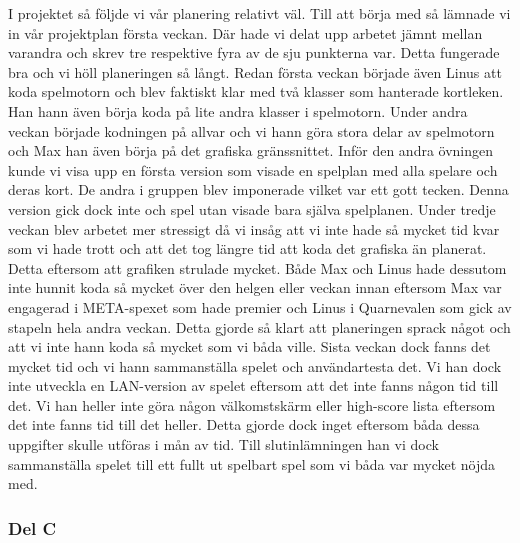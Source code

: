 \documentclass[10pt,a4paper]{article}
\begin{document}
I projektet så följde vi vår planering relativt väl. Till att börja med så lämnade vi in vår projektplan första veckan. Där hade vi delat upp arbetet jämnt mellan varandra och skrev tre respektive fyra av de sju punkterna var. Detta fungerade bra och vi höll planeringen så långt. Redan första veckan började även Linus att koda spelmotorn och blev faktiskt klar med två klasser som hanterade kortleken. Han hann även börja koda på lite andra klasser i spelmotorn. Under andra veckan började kodningen på allvar och vi hann göra stora delar av spelmotorn och Max han även börja på det grafiska gränssnittet. Inför den andra övningen kunde vi visa upp en första version som visade en spelplan med alla spelare och deras kort. De andra i gruppen blev imponerade vilket var ett gott tecken. Denna version gick dock inte och spel utan visade bara själva spelplanen. Under tredje veckan blev arbetet mer stressigt då vi insåg att vi inte hade så mycket tid kvar som vi hade trott och att det tog längre tid att koda det grafiska än planerat. Detta eftersom att grafiken strulade mycket. Både Max och Linus hade dessutom inte hunnit koda så mycket över den helgen eller veckan innan eftersom Max var engagerad i META-spexet som hade premier och Linus i Quarnevalen som gick av stapeln hela andra veckan. Detta gjorde så klart att planeringen sprack något och att vi inte hann koda så mycket som vi båda ville. Sista veckan dock fanns det mycket tid och vi hann sammanställa spelet och användartesta det. Vi han dock inte utveckla en LAN-version av spelet eftersom att det inte fanns någon tid till det. Vi han heller inte göra någon välkomstskärm eller high-score lista eftersom det inte fanns tid till det heller. Detta gjorde dock inget eftersom båda dessa uppgifter skulle utföras i mån av tid. Till slutinlämningen han vi dock sammanställa spelet till ett fullt ut spelbart spel som vi båda var mycket nöjda med.

\subsubsection*{Del C}
\end{document}
